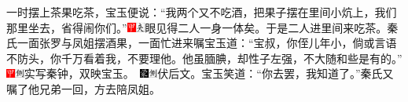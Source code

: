 一时摆上茶果吃茶，宝玉便说：``我两个又不吃酒，把果子摆在里间小炕上，我们那里坐去，省得闹你们。''{\includegraphics[width=3mm]{../Images/00002}\includegraphics[width=3mm]{../Images/00012}\footnotesize \kaishu 眼见得二人一身一体矣。}于是二人进里间来吃茶。秦氏一面张罗与凤姐摆酒果，一面忙进来嘱宝玉道：``宝叔，你侄儿年小，倘或言语不防头，你千万看着我，不要理他。他虽腼腆，却性子左强，不大随和些是有的。''{{\includegraphics[width=3mm]{../Images/00002}\includegraphics[width=3mm]{../Images/00011}\footnotesize \kaishu 实写秦钟，双映宝玉。　}\includegraphics[width=3mm]{../Images/00006}\includegraphics[width=3mm]{../Images/00011}\footnotesize \kaishu 伏后文。}宝玉笑道：``你去罢，我知道了。''秦氏又嘱了他兄弟一回，方去陪凤姐。

